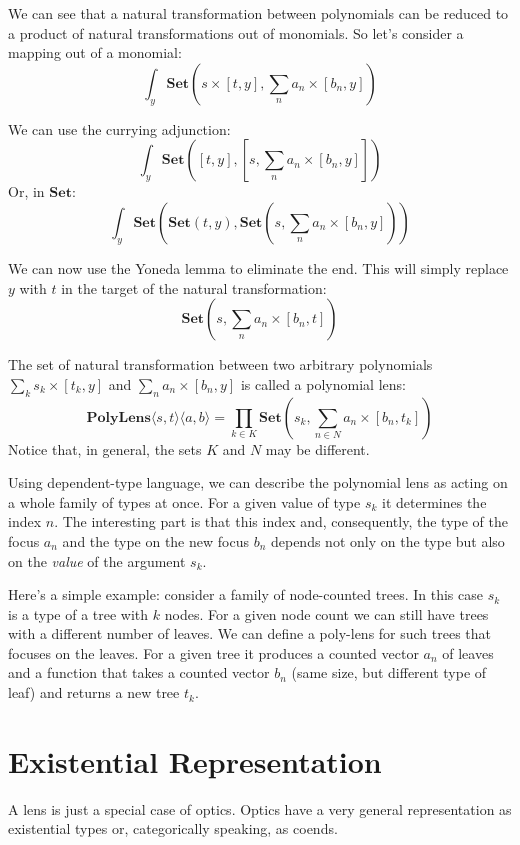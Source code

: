 \documentclass[11pt]{amsart}
\begin{document}
We can see that a natural transformation between polynomials can be reduced to a product of natural transformations out of monomials. So let's consider a mapping out of a monomial:
\[ \int_y \mathbf{Set} \left( s \times [t, y], \sum_n a_n \times [b_n, y]\right) \]
 
 We can use the currying adjunction:
\[ \int_y \mathbf{Set} \left( 
    [t, y],  \left[s, \sum_n a_n \times [b_n, y]\right]  \right) \]
 Or, in $\mathbf{Set}$:
 \[ \int_y \mathbf{Set} \left( 
    \mathbf{Set}(t, y), \mathbf{Set} \left(s, \sum_n a_n \times [b_n, y]\right)  \right) \]

 We can now use the Yoneda lemma to eliminate the end. This will simply replace $y$ with $t$ in the target of the natural transformation:
 \[ \mathbf{Set}\left(s, \sum_n a_n \times [b_n, t] \right) \]
 
The set of natural transformation between two arbitrary polynomials $\sum_k s_k \times [t_k, y]$ and $\sum_n a_n \times [b_n, y]$ is called a polynomial lens:
 \[ \mathbf{PolyLens}\langle s, t\rangle \langle a, b\rangle = \prod_{k \in K} \mathbf{Set}\left(s_k, \sum_{n \in N} a_n \times [b_n, t_k] \right) \]
Notice that, in general, the sets $K$ and $N$ may be different. 

Using dependent-type language, we can describe the polynomial lens as acting on a whole family of types at once. For a given value of type $s_k$ it determines the index $n$. The interesting part is that this index and, consequently, the type of the focus $a_n$ and the type on the new focus $b_n$ depends not only on the type but also on the \emph{value} of the argument $s_k$. 

Here's a simple example: consider a family of node-counted trees. In this case $s_k$ is a type of a tree with $k$ nodes. For a given node count we can still have trees with a different number of leaves. We can define a poly-lens for such trees that focuses on the leaves. For a given tree it produces a counted vector $a_n$ of leaves and a function that takes a counted vector $b_n$  (same size, but different type of leaf) and returns a new tree $t_k$. 

\section{Existential Representation}


A lens is just a special case of optics. Optics have a very general representation as existential types or, categorically speaking, as coends. 
\end{document}

